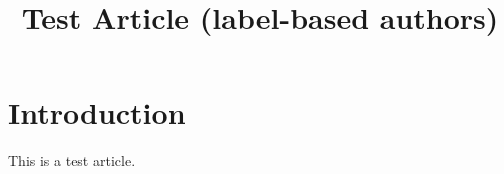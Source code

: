 \documentclass{ccr}
\title{Test Article (label-based authors)}
\begin{document}
\maketitle

\section{Introduction}
This is a test article.

\printbibliography
\end{document}
